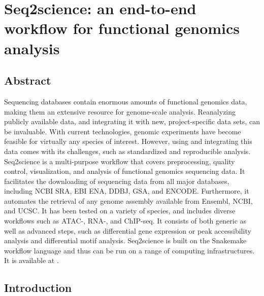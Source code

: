 \chapter{Seq2science: an end-to-end workflow for functional genomics analysis}\thumbforchapter
{}
\newpage

\section{Abstract}

Sequencing databases contain enormous amounts of functional genomics data, making them an extensive resource for genome-scale analysis. Reanalyzing publicly available data, and integrating it with new, project-specific data sets, can be invaluable. With current technologies, genomic experiments have become feasible for virtually any species of interest. However, using and integrating this data comes with its challenges, such as standardized and reproducible analysis. Seq2science is a multi-purpose workflow that covers preprocessing, quality control, visualization, and analysis of functional genomics sequencing data. It facilitates the downloading of sequencing data from all major databases, including NCBI SRA, EBI ENA, DDBJ, GSA, and ENCODE. Furthermore, it automates the retrieval of any genome assembly available from Ensembl, NCBI, and UCSC. It has been tested on a variety of species, and includes diverse workflows such as ATAC-, RNA-, and ChIP-seq. It consists of both generic as well as advanced steps, such as differential gene expression or peak accessibility analysis and differential motif analysis. Seq2science is built on the Snakemake workflow language and thus can be run on a range of computing infrastructures. It is available at \href{https://github.com/vanheeringen-lab/seq2science}{\color{blue}{https://github.com/vanheeringen-lab/seq2science}}.

\section{Introduction}

